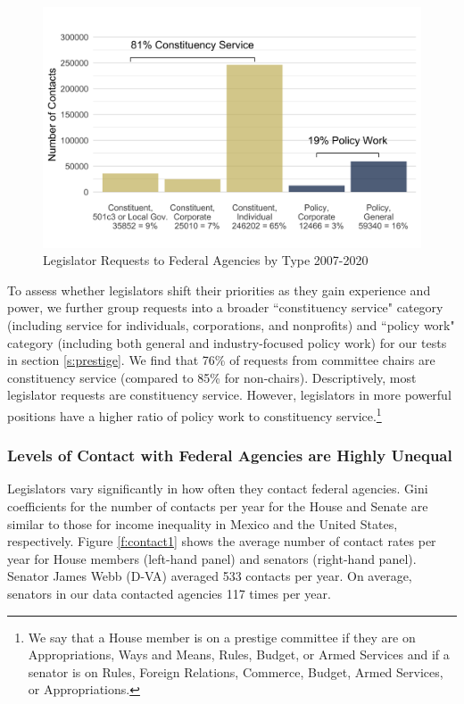 \documentclass[12pt]{article}
\begin{document}
\begin{figure}[hbt!]
\centering
\caption{Legislator Requests to Federal Agencies by Type 2007-2020} \label{f:type2}
\includegraphics[width = .8\textwidth]{figs/data_by_type-tall-1}
\end{figure}



To assess whether legislators shift their priorities as they gain experience and power, we further group requests into a broader ``constituency service"  category (including service for individuals, corporations, and nonprofits) and ``policy work" category (including both general and industry-focused policy work) for our tests in section \ref{s:prestige}. We find that 76\% of requests from committee chairs are constituency service (compared to 85\% for non-chairs). %
Descriptively, most legislator requests are constituency service. However, legislators in more powerful positions have a higher ratio of policy work to constituency service.\footnote{We say that a House member is on a prestige committee if they are on Appropriations, Ways and Means, Rules, Budget, or Armed Services and if a senator is on Rules, Foreign Relations, Commerce, Budget, Armed Services, or Appropriations.} %


\subsubsection{Levels of Contact with Federal Agencies are Highly Unequal}
Legislators vary significantly in how often they contact federal agencies. Gini coefficients for the number of contacts per year for the House and Senate are similar to those for income inequality in Mexico and the United States, respectively. Figure \ref{f:contact1} shows the average number of contact rates per year for House members (left-hand panel) and senators (right-hand panel). Senator James Webb (D-VA) averaged 533 contacts per year. %
On average, senators in our data contacted agencies 117 times per year.   
 
\end{document}
